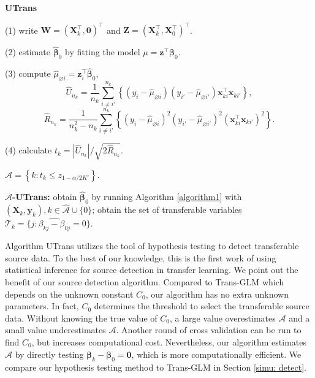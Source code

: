 \documentclass[twoside,12pt]{article}
\newcommand{\mb}[1]{\boldsymbol{\mathbf{#1}}}
\newcommand{\wh}[1]{\widehat{#1}}
\begin{document}
\begin{algorithm}[hbt!]
\caption{\textbf{UTrans}}
\label{4algorithm2}
\SetAlgoLined
\KwIn{$\{(\mb X_k, \mb y_k), 0\leq k\leq K'\}$.}

 {%
	(1) write $\mb W=(\mb X_k^\top, \mb 0)^\top$ and $\mb Z=(\mb X_k^\top, \mb X_0^\top)^\top$.
	
	(2) estimate $\wh{\mb\beta}_0$ by fitting the model $\mu=\mb z^\top\mb\beta_0$.
	
	(3) compute $\hat{\mu}_{\varnothing i}=\mb z_{i}^\top \wh{\mb\beta}_0$,
	$$
	\hat{U}_{n_k}=\frac{1}{n_k} \sum_{i \neq i'}^{n_k}\left\{\left(y_i-\hat{\mu}_{\varnothing i}\right)\left(y_{i'}-\hat{\mu}_{\varnothing i'}\right) \mb x_{ki}^\top \mb x_{ki'}\right\},
	$$
	$$\hat{R}_{n_k}=\frac{1}{n_k^2-n_k} \sum_{i \neq i'}^{n_k}\left\{\left(y_i-\hat{\mu}_{\varnothing i}\right)^2\left(y_{i'}-\hat{\mu}_{\varnothing i'}\right)^2\left(\mb x_{ki}^\top \mb x_{ki'}\right)^2\right\}.$$
	
	(4) calculate $t_k=|\hat{U}_{n_k}|/\sqrt{2\hat R_{n_k}}$.	
}

$\wh{\mathcal A}=\left\{k: t_k\leq z_{1-\alpha/2K'}\right\}$.

\textbf{$\mathcal A$-UTrans:} obtain $\wh{\mb\beta}_0$ by running Algorithm \ref{algorithm1} with $(\mb X_k, \mb y_k), k\in\mathcal{\wh{\mathcal A}}\cup\{0\}$; obtain the set of transferable variables $\mathcal T_k=\{j: \wh{\beta_{kj}-\beta_{0j}}=0\}.$

\KwOut{$\wh{\mathcal A}$, $\wh{\mb\beta}_0$, and $\mathcal T_k$.}
\end{algorithm}


Algorithm UTrans
utilizes the tool of hypothesis testing to detect transferable source data.
To the best of our knowledge, this is the first work of using statistical inference for source detection in transfer learning.
We point out the benefit of our source detection algorithm. 
Compared to Trans-GLM \citep{tian2022transfer} which depends on the unknown constant $C_0$, our algorithm has no extra unknown parameters.
In fact, $C_0$ determines the threshold to select the transferable source data.
Without knowing the true value of $C_0$, a large value overestimates $\mathcal A$ and a small value underestimates $\mathcal A$.
Another round of cross validation can be run to find $C_0$, but increases computational cost.
Nevertheless, our algorithm estimates $\wh{\mathcal A}$ by directly testing $\mb\beta_k-\mb\beta_0=\mb 0$, which is more computationally efficient.
We compare our hypothesis testing method to Trans-GLM in Section \ref{simu: detect}.
	
\end{document}
